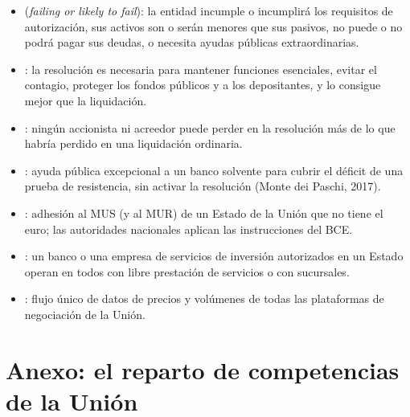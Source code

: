 \documentclass[11pt]{article}
\begin{document}
\begin{itemize}
\item {} (\emph{failing or likely to fail}): la entidad incumple o incumplirá los requisitos de autorización, sus activos son o serán menores que sus pasivos, no puede o no podrá pagar sus deudas, o necesita ayudas públicas extraordinarias.
\item {}: la resolución es necesaria para mantener funciones esenciales, evitar el contagio, proteger los fondos públicos y a los depositantes, y lo consigue mejor que la liquidación.
\item {}: ningún accionista ni acreedor puede perder en la resolución más de lo que habría perdido en una liquidación ordinaria.
\item {}: ayuda pública excepcional a un banco solvente para cubrir el déficit de una prueba de resistencia, sin activar la resolución (Monte dei Paschi, 2017).
\item {}: adhesión al MUS (y al MUR) de un Estado de la Unión que no tiene el euro; las autoridades nacionales aplican las instrucciones del BCE.
\item {}: un banco o una empresa de servicios de inversión autorizados en un Estado operan en todos con libre prestación de servicios o con sucursales.
\item {}: flujo único de datos de precios y volúmenes de todas las plataformas de negociación de la Unión.
\end{itemize}

\section{Anexo: el reparto de competencias\cortetitulo{} de la Unión}\label{anexo:competencias}
\end{document}
